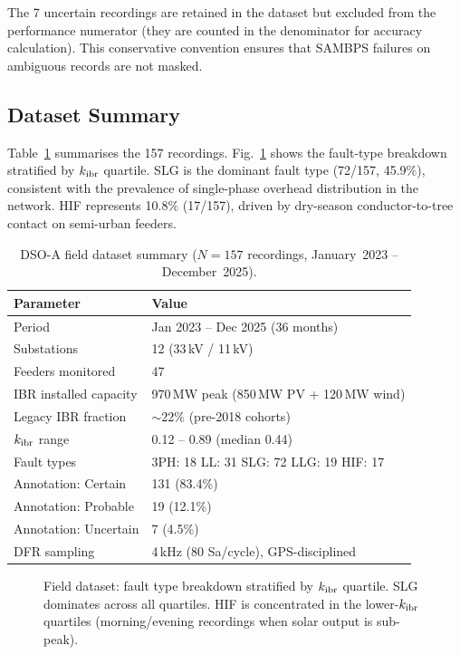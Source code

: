\documentclass[journal]{IEEEtran}
\newcommand{\kibr}{k_{\rm ibr}}
\begin{document}
The 7 uncertain recordings are retained in the dataset but excluded from
the performance numerator (they are counted in the denominator for
accuracy calculation).  This conservative convention ensures that SAMBPS
failures on ambiguous records are not masked.

\subsection{Dataset Summary}

Table~\ref{tab:dataset} summarises the 157 recordings.
Fig.~\ref{fig:dataset} shows the fault-type breakdown stratified by
$\kibr$ quartile.  SLG is the dominant fault type (72/157, 45.9\%),
consistent with the prevalence of single-phase overhead distribution
in the network.  HIF represents 10.8\% (17/157), driven by dry-season
conductor-to-tree contact on semi-urban feeders.

\begin{table}[htbp]
  \centering
  \caption{DSO-A field dataset summary ($N = 157$ recordings,
  January~2023 -- December~2025).}
  \label{tab:dataset}
  \small
  \begin{tabularx}{\columnwidth}{@{}lX@{}}
    \toprule
    Parameter & Value \\
    \midrule
    Period & Jan 2023 -- Dec 2025 (36 months) \\
    Substations & 12 (33\,kV / 11\,kV) \\
    Feeders monitored & 47 \\
    IBR installed capacity & 970\,MW peak (850\,MW PV + 120\,MW wind) \\
    Legacy IBR fraction & $\sim 22\%$ (pre-2018 cohorts) \\
    $\kibr$ range & 0.12 -- 0.89 (median 0.44) \\
    Fault types & 3PH: 18 \quad LL: 31 \quad SLG: 72 \quad LLG: 19 \quad HIF: 17 \\
    Annotation: Certain & 131 (83.4\%) \\
    Annotation: Probable & 19 (12.1\%) \\
    Annotation: Uncertain & 7 (4.5\%) \\
    DFR sampling & 4\,kHz (80 Sa/cycle), GPS-disciplined \\
    \bottomrule
  \end{tabularx}
\end{table}

\begin{figure}[htbp]
  \centering
  
  \caption{Field dataset: fault type breakdown stratified by $\kibr$ quartile.
           SLG dominates across all quartiles.  HIF is concentrated in the
           lower-$\kibr$ quartiles (morning/evening recordings when solar
           output is sub-peak).}
  \label{fig:dataset}
\end{figure}
\end{document}
